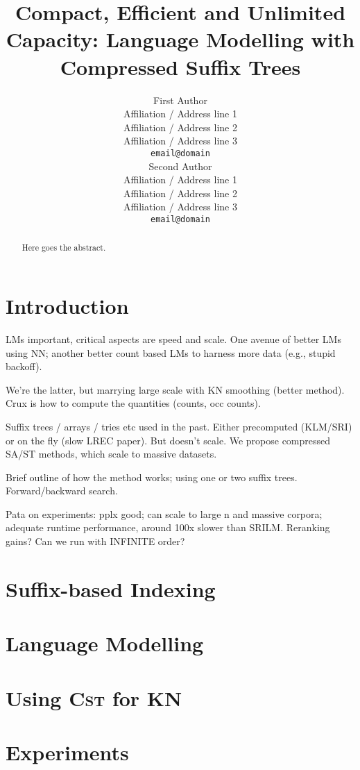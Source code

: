 \documentclass[11pt,a4paper]{article}
\title{Compact, Efficient and Unlimited Capacity:
    Language Modelling with Compressed Suffix Trees}
\author{First Author \\
  Affiliation / Address line 1 \\
  Affiliation / Address line 2 \\
  Affiliation / Address line 3 \\
  {\tt email@domain} \\\And
  Second Author \\
  Affiliation / Address line 1 \\
  Affiliation / Address line 2 \\
  Affiliation / Address line 3 \\
  {\tt email@domain} \\}
\date{}
\newcommand*\CST{\textsc{Cst}\xspace}
\begin{document}
\maketitle
\begin{abstract}
  Here goes the abstract.
\end{abstract}

\section{Introduction}

LMs important, critical aspects are speed and scale. One avenue of better LMs using NN; another
better count based LMs to harness more data (e.g., stupid backoff). 

We're the latter, but marrying large scale with KN smoothing (better method). Crux is how to compute
the quantities (counts, occ counts). 

Suffix trees / arrays / tries etc used in the past. Either precomputed (KLM/SRI) or on the fly (slow
LREC paper). But doesn't scale. We propose compressed SA/ST methods, which scale to massive datasets.

Brief outline of how the method works; using one or two suffix trees. Forward/backward search.

Pata on experiments: pplx good; can scale to large n and massive corpora; adequate runtime
performance, around 100x slower than SRILM. Reranking gains? Can we run with INFINITE order?

\section{Suffix-based Indexing}


\section{Language Modelling}


\section{Using \CST for KN}


\section{Experiments}

\end{document}
